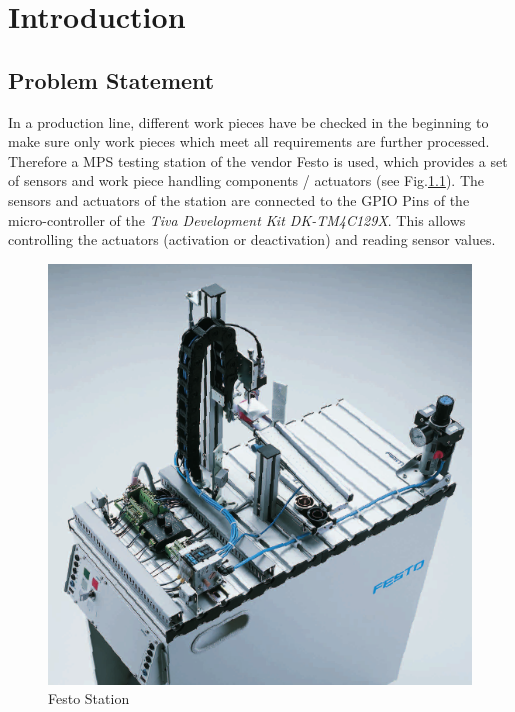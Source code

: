 \chapter{Introduction} \label{ch:Introduction} %

\section{Problem Statement} \label{sec:ProblemStatement}
In a production line, different work pieces have be checked in the beginning to make sure only work pieces which meet all requirements are further processed. Therefore a MPS testing station of the vendor Festo is used, which provides a set of sensors and work piece handling components / actuators (see Fig.\ref{fig:festostation}). The sensors and actuators of the station are connected to the GPIO Pins of the micro-controller of the \textit{Tiva Development Kit DK-TM4C129X}. This allows controlling the actuators (activation or deactivation) and reading sensor values.

\begin{figure}[H]
	\begin{center}
		\includegraphics[scale=.50]{media/FestoStation.png} 	
		\caption{Festo Station}
		\label{fig:festostation}
	\end{center}
\end{figure}


